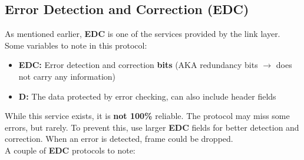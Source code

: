 \documentclass{article}
\begin{document}
\subsection{Error Detection and Correction (EDC)}
As mentioned earlier, \textbf{EDC} is one of the services provided by the link layer. Some variables
to note in this protocol:
\begin{itemize}
    \item \textbf{EDC:} Error detection and correction \textbf{bits} (AKA redundancy bits $\rightarrow$
    does not carry any information)
    \item \textbf{D:} The data protected by error checking, can also include header fields
\end{itemize}
While this service exists, it is \textbf{not 100\%} reliable. The protocol may miss some errors, but
rarely. To prevent this, use larger \textbf{EDC} fields for better detection and correction. When an
error is detected, frame could be dropped. \\
A couple of \textbf{EDC} protocols to note:
\end{document}
